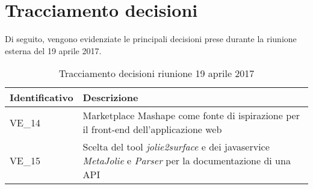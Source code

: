 \section{Tracciamento decisioni}
Di seguito, vengono evidenziate le principali decisioni prese durante la riunione esterna del 19 aprile 2017.

\begin{table}[H]
	\begin{center}
		\begin{tabular}{|p{3cm}| p{11cm}|}
			\hline
			\textbf{Identificativo}	& \textbf{Descrizione} \\
			\hline
			VE\_14	&  Marketplace Mashape come fonte di ispirazione per il front-end dell'applicazione web \\
			\hline
			VE\_15 &  Scelta del tool \textit{jolie2surface} e dei javaservice \textit{MetaJolie} e \textit{Parser} per la documentazione di una API\\
			\hline
		\end{tabular}
		\caption{Tracciamento decisioni riunione 19 aprile 2017}
	\end{center}
\end{table}